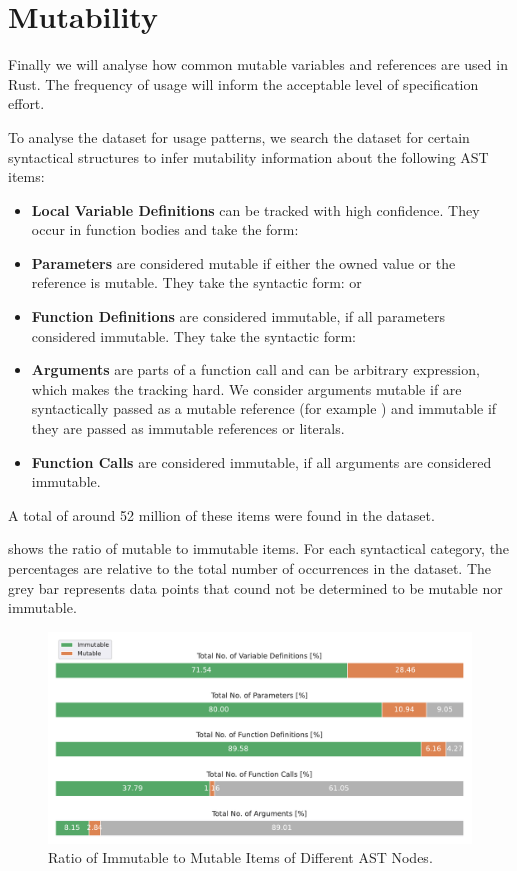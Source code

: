 \documentclass[twoside, english, final]{sdqthesis}
\theoremstyle{definition}
\begin{document}
\section{Mutability} \label{sec:analysis-mutability}

Finally we will analyse how common mutable variables and references are used in Rust. 
The frequency of usage will inform the acceptable level of specification effort.

To analyse the dataset for usage patterns, we search the dataset for certain syntactical structures to infer mutability information about the following AST items:
\begin{itemize}
	\item \textbf{Local Variable Definitions} can be tracked with high confidence. They occur in function bodies and take the form: 
	\item \textbf{Parameters} are considered mutable if either the owned value or the reference is mutable. They take the syntactic form:  or 
	\item \textbf{Function Definitions} are considered immutable, if all parameters considered immutable. They take the syntactic form: 
	\item \textbf{Arguments} are parts of a function call and can be arbitrary expression, which makes the tracking hard. We consider arguments mutable if are syntactically passed as a mutable reference (for example ) and immutable if they are passed as immutable references or literals.
	\item \textbf{Function Calls} are considered immutable, if all arguments are considered immutable.
\end{itemize}

A total of around 52 million of these items were found in the dataset.

 shows the ratio of mutable to immutable items. For each syntactical category, the percentages are relative to the total number of occurrences in the dataset. The grey bar represents data points that cound not be determined to be mutable nor immutable.


\begin{figure}[h]
	\centering
	\includegraphics[width=0.9\linewidth, clip, trim={0.5cm 0.5cm 0.5cm 0.5cm}]{../mutability_by_category.pdf}
	\caption{Ratio of Immutable to Mutable Items of Different AST Nodes.}
	\label{fig:mutabillity_percentages}
\end{figure}
\end{document}
